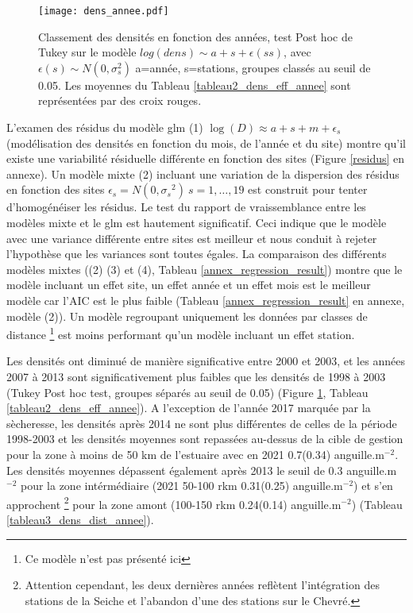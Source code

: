 \documentclass[10pt,twocolumn,titlepage,twoside]{article}\usepackage[]{graphicx}\usepackage[]{xcolor}
\begin{document}
\begin{figure}[htbp]
\centering
 \texttt{[image: dens\_annee.pdf]} 
\caption[Tendance des densités modèle]{Classement des densités en fonction des
années, test Post hoc de Tukey sur le modèle $log(dens) \sim a +s +
\epsilon(ss)$, avec $\epsilon(s) \sim N(0,\sigma_s^2)$ a=année, s=stations,
groupes classés au seuil de 0.05. Les moyennes du Tableau
\ref{tableau2_dens_eff_annee} sont représentées par des croix rouges.
}
\label{dens_annee}
\end{figure}

L'examen des résidus du modèle glm (1) $\log
(D){\approx}a+s+m+\epsilon_s$ (modélisation des densités en fonction du mois, de
l'année et du site) montre qu'il existe une variabilité résiduelle différente en fonction des sites (Figure \ref{residus} en annexe).  Un
modèle mixte (2) incluant une variation de la dispersion des résidus en fonction
des sites $\epsilon_s=N(0,{\sigma_{s}}^2) ~s=1,\dots,19$
\citep{zuur_mixed_2009} est construit pour tenter d'homogénéiser les résidus. Le
test du rapport de vraissemblance entre les modèles mixte et le glm est
hautement significatif. Ceci indique que le modèle avec une variance différente entre
sites est meilleur et nous conduit à rejeter l'hypothèse que les variances sont
toutes égales.
La comparaison des différents modèles mixtes ((2) (3) et (4), Tableau
\ref{annex_regression_result}) montre
que le modèle incluant un effet site, un effet année et un effet mois est le
meilleur modèle car l'AIC est le plus faible (Tableau
\ref{annex_regression_result} en annexe, modèle (2)). Un modèle regroupant
uniquement les données par classes de distance \footnote{Ce modèle n'est pas présenté ici} est moins performant
qu'un modèle incluant un effet station.

Les densités ont diminué de manière
significative entre 2000 et 2003, et les années 2007 à 2013
sont significativement plus faibles que les densités de 1998 à 2003 (Tukey
Post hoc test, groupes séparés au seuil de 0.05) (Figure \ref{dens_annee},
Tableau \ref{tableau2_dens_eff_annee}).
A l'exception de l'année 2017 marquée par la sècheresse, les densités après 2014
ne sont plus différentes de celles de la période 1998-2003 et les densités moyennes sont
repassées au-dessus de la cible de gestion pour la zone à moins de 50 km de
l'estuaire avec en 2021 0.7(0.34) anguille.m$^{-2}$. Les
densités moyennes dépassent également après 2013 le seuil de 0.3
anguille.m$^{-2}$ pour la zone intérmédiaire (2021 50-100 rkm 0.31(0.25)
anguille.m$^{-2}$) et s'en approchent \footnote{Attention cependant, les deux
dernières années reflètent l'intégration des stations de la Seiche et l'abandon d'une des
stations sur le Chevré.} pour la zone amont (100-150 rkm
0.24(0.14) anguille.m$^{-2}$) (Tableau \ref{tableau3_dens_dist_annee}). 
\end{document}

